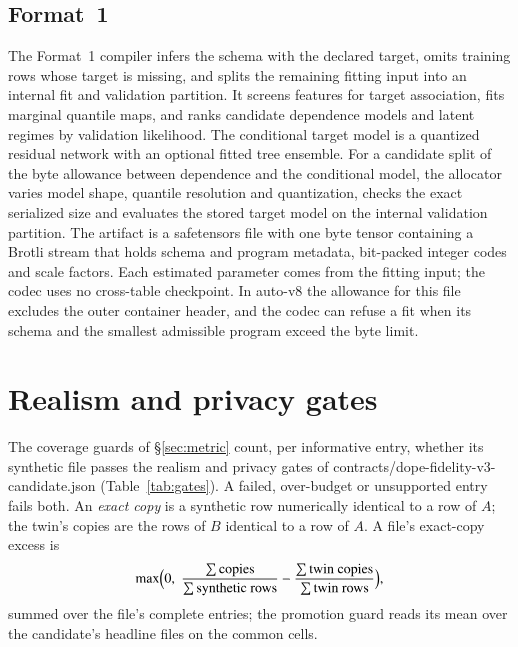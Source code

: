 \documentclass[10pt,letterpaper,twocolumn]{article}
\newcommand{\cli}[1]{{\ttfamily\fontsize{8.9}{11}\selectfont #1}}
\begin{document}
\subsection{Format~1}
The Format~1 compiler infers the schema with the declared target, omits training rows whose target is missing, and splits the remaining fitting input into an internal fit and validation partition. It screens features for target association, fits marginal quantile maps, and ranks candidate dependence models and latent regimes by validation likelihood. The conditional target model is a quantized residual network with an optional fitted tree ensemble. For a candidate split of the byte allowance between dependence and the conditional model, the allocator varies model shape, quantile resolution and quantization, checks the exact serialized size and evaluates the stored target model on the internal validation partition. The artifact is a safetensors file with one byte tensor containing a Brotli stream that holds schema and program metadata, bit-packed integer codes and scale factors. Each estimated parameter comes from the fitting input; the codec uses no cross-table checkpoint. In \cli{auto-v8} the allowance for this file excludes the outer container header, and the codec can refuse a fit when its schema and the smallest admissible program exceed the byte limit.

\section{Realism and privacy gates}\label{app:gates}
The coverage guards of \S\ref{sec:metric} count, per informative entry, whether its synthetic file passes the realism and privacy gates of \cli{contracts/dope-fidelity-v3-candidate.json} (Table~\ref{tab:gates}). A failed, over-budget or unsupported entry fails both. An \emph{exact copy} is a synthetic row numerically identical to a row of $A$; the twin's copies are the rows of $B$ identical to a row of $A$. A file's exact-copy excess is
\begin{equation}
  \max\Bigl(0,\;\frac{\sum\text{copies}}{\sum\text{synthetic rows}}-\frac{\sum\text{twin copies}}{\sum\text{twin rows}}\Bigr),
\end{equation}
summed over the file's complete entries; the promotion guard reads its mean over the candidate's headline files on the common cells.
\end{document}
